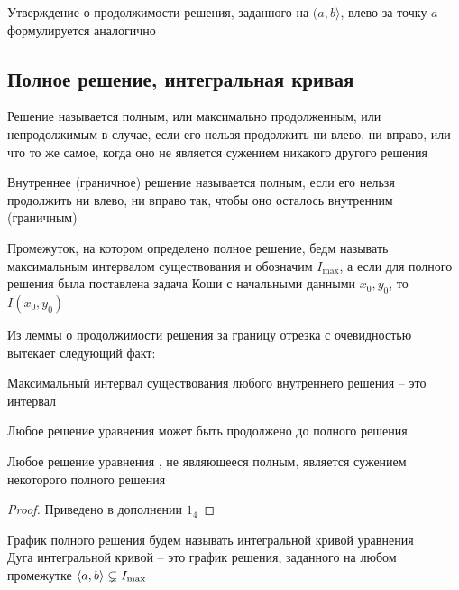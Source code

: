 Утверждение о продолжимости решения, заданного на $ (a, b \rangle $, влево за точку $ a $ формулируется аналогично

\subsection{Полное решение, интегральная кривая}

\begin{definition}
	Решение называется полным, или максимально продолженным, или непродолжимым в случае, если его нельзя продолжить ни влево, ни вправо, или что то же самое, когда оно не является сужением никакого другого решения
\end{definition}

\begin{definition}
	Внутреннее (граничное) решение называется полным, если его нельзя продолжить ни влево, ни вправо так, чтобы оно осталось внутренним (граничным)
\end{definition}

\begin{definition}
    Промежуток, на котором определено полное решение, бедм называть максимальным интервалом существования и обозначим $ I_{\max} $, а если для полного решения была поставлена задача Коши с начальными данными $ x_0, y_0 $, то $ I(x_0, y_0) $
\end{definition}

Из леммы о продолжимости решения за границу отрезка с очевидностью вытекает следующий факт:
\begin{statement}
	Максимальный интервал существования любого внутреннего решения -- это интервал
\end{statement}

\begin{theorem}\label{th:exist}
    Любое решение уравнения  может быть продолжено до полного решения
\end{theorem}

\begin{restate}
    Любое решение уравнения , не являющееся полным, является сужением некоторого полного решения
\end{restate}

\begin{proof}
	Приведено в дополнении $ 1_4 $
\end{proof}

\begin{definition}
    График полного решения будем называть интегральной кривой уравнения  \\
    Дуга интегральной кривой -- это график решения, заданного на любом промежутке $ \Braket{a, b} \subsetneq I_{\max} $
\end{definition}

